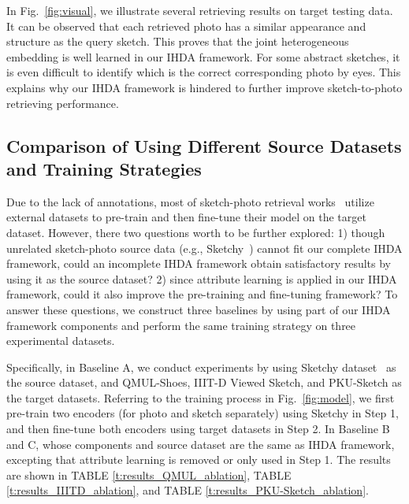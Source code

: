 \documentclass[journal]{IEEEtran}
\begin{document}
In Fig.~\ref{fig:visual}, we illustrate several retrieving results on target testing data. It can be observed that each retrieved photo has a similar appearance and structure as the query sketch. This proves that the joint heterogeneous embedding is well learned in our IHDA framework. For some abstract sketches, it is even difficult to identify which is the correct corresponding photo by eyes. This explains why our IHDA framework is hindered to further improve sketch-to-photo retrieving performance. 


\subsection{Comparison of Using Different Source Datasets and Training Strategies }

Due to the lack of annotations, most of sketch-photo retrieval works~\cite{song2016deep, pang2018cross, song2017deep, parkhi2015deep, wu2018light, wu2018coupled, deng2019residual,SangkloyBHH16} utilize external datasets to pre-train and then fine-tune their model on the target dataset. However, there two questions worth to be further explored: 1) though unrelated sketch-photo source data (e.g., Sketchy~\cite{sangkloy2016sketchy}) cannot fit our complete IHDA framework, could an incomplete IHDA framework obtain satisfactory results by using it as the source dataset? 2) since attribute learning is applied in our IHDA framework, could it also improve the pre-training and fine-tuning framework? To answer these questions, we construct three baselines by using part of our IHDA framework components and perform the same training strategy on three experimental datasets.

Specifically, in Baseline A, we conduct experiments by using Sketchy dataset~\cite{sangkloy2016sketchy} as the source dataset, and QMUL-Shoes, IIIT-D Viewed Sketch, and PKU-Sketch as the target datasets. Referring to the training process in Fig.~\ref{fig:model}, we first pre-train two encoders (for photo and sketch separately) using Sketchy in Step 1, and then fine-tune both encoders using target datasets in Step 2. In Baseline B and C, whose components and source dataset are the same as IHDA framework, excepting that attribute learning is removed or only used in Step 1. The results are shown in TABLE \ref{t:results_QMUL_ablation}, TABLE \ref{t:results_IIITD_ablation}, and TABLE \ref{t:results_PKU-Sketch_ablation}.
\end{document}
